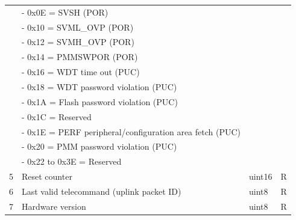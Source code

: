 \begin{longtable}[c]{cL{0.70\textwidth}lc}
	                     & - 0x0E = SVSH (POR)                                                              &                          &                     \\
	                     & - 0x10 = SVML\_OVP (POR)                                                         &                          &                     \\
	                     & - 0x12 = SVMH\_OVP (POR)                                                         &                          &                     \\
	                     & - 0x14 = PMMSWPOR (POR)                                                          &                          &                     \\
	                     & - 0x16 = WDT time out (PUC)                                                      &                          &                     \\
	                     & - 0x18 = WDT password violation (PUC)                                            &                          &                     \\
	                     & - 0x1A = Flash password violation (PUC)                                          &                          &                     \\
	                     & - 0x1C = Reserved                                                                &                          &                     \\
	                     & - 0x1E = PERF peripheral/configuration area fetch (PUC)                          &                          &                     \\
	                     & - 0x20 = PMM password violation (PUC)                                            &                          &                     \\
	                     & - 0x22 to 0x3E = Reserved                                                        &                          &                     \\
	5                    & Reset counter                                                                    & uint16                   & R                   \\
	6                    & Last valid telecommand (uplink packet ID)                                        & uint8                    & R                   \\
	7                    & Hardware version                                                                 & uint8                    & R                   \\

\end{longtable}
